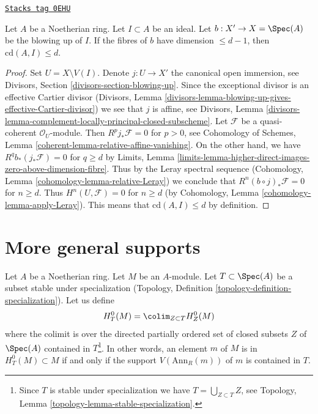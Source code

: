 \begin{lemma}[Cd blowup]
\label{local-cohomology-lemma-cd-blowup}
\href{https://stacks.math.columbia.edu/tag/0EHU}{\texttt{Stacks tag 0EHU}}

Let $A$ be a Noetherian ring. Let $I \subset A$ be an ideal.
Let $b : X' \to X = \Spec(A)$ be the blowing up of $I$.
If the fibres of $b$ have dimension $\leq d - 1$, then
$\text{cd}(A, I) \leq d$.
\end{lemma}

\begin{proof}
Set $U = X \setminus V(I)$. Denote $j : U \to X'$ the canonical open
immersion, see Divisors, Section \ref{divisors-section-blowing-up}.
Since the exceptional divisor is an effective Cartier divisor
(Divisors, Lemma
\ref{divisors-lemma-blowing-up-gives-effective-Cartier-divisor})
we see that $j$ is affine, see
Divisors, Lemma
\ref{divisors-lemma-complement-locally-principal-closed-subscheme}.
Let $\mathcal{F}$ be a quasi-coherent $\mathcal{O}_U$-module.
Then $R^pj_*\mathcal{F} = 0$ for $p > 0$, see
Cohomology of Schemes, Lemma
\ref{coherent-lemma-relative-affine-vanishing}.
On the other hand, we have $R^qb_*(j_*\mathcal{F}) = 0$ for
$q \geq d$ by Limits, Lemma
\ref{limits-lemma-higher-direct-images-zero-above-dimension-fibre}.
Thus by the Leray spectral sequence
(Cohomology, Lemma \ref{cohomology-lemma-relative-Leray})
we conclude that $R^n(b \circ j)_*\mathcal{F} = 0$ for
$n \geq d$. Thus $H^n(U, \mathcal{F}) = 0$ for $n \geq d$
(by Cohomology, Lemma \ref{cohomology-lemma-apply-Leray}).
This means that $\text{cd}(A, I) \leq d$ by definition.
\end{proof}

\section{More general supports}
\label{local-cohomology-section-supports}
Let $A$ be a Noetherian ring. Let $M$ be an $A$-module.
Let $T \subset \Spec(A)$ be a subset stable under specialization
(Topology, Definition \ref{topology-definition-specialization}).
Let us define
$$
H^0_T(M) = \colim_{Z \subset T} H^0_Z(M)
$$
where the colimit is over the directed partially ordered set of
closed subsets $Z$ of $\Spec(A)$ contained in
$T$\footnote{Since $T$ is stable under specialization
we have $T = \bigcup_{Z \subset T} Z$, see
Topology, Lemma \ref{topology-lemma-stable-specialization}.}.
In other words, an element $m$ of $M$ is in $H^0_T(M) \subset M$
if and only if the support $V(\text{Ann}_R(m))$ of $m$
is contained in $T$.

